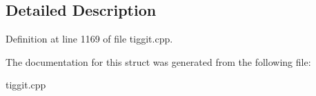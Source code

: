 \subsection{Detailed Description}


Definition at line 1169 of file tiggit.\-cpp.



The documentation for this struct was generated from the following file\-:\begin{DoxyCompactItemize}
\item 
tiggit.\-cpp\end{DoxyCompactItemize}
